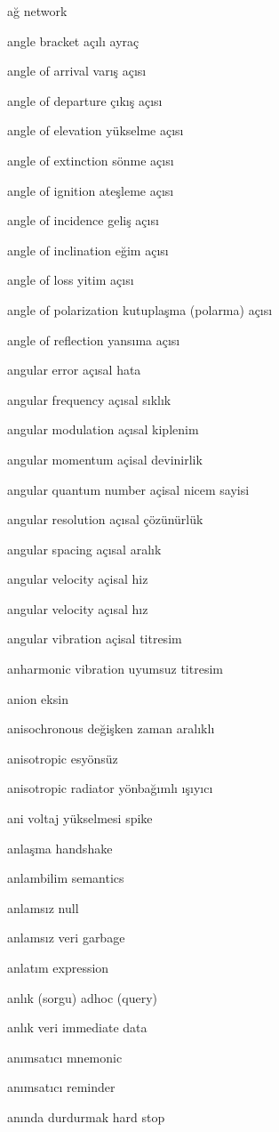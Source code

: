 \documentclass[12pt,fleqn]{article}\usepackage{../../common}
\begin{document}
ağ network

angle bracket açılı ayraç

angle of arrival varış açısı

angle of departure çıkış açısı

angle of elevation yükselme açısı

angle of extinction sönme açısı

angle of ignition ateşleme açısı

angle of incidence geliş açısı

angle of inclination eğim açısı

angle of loss yitim açısı

angle of polarization kutuplaşma (polarma) açısı

angle of reflection yansıma açısı

angular error açısal hata

angular frequency açısal sıklık

angular modulation açısal kiplenim

angular momentum açisal devinirlik

angular quantum number açisal nicem sayisi

angular resolution açısal çözünürlük

angular spacing açısal aralık

angular velocity açisal hiz

angular velocity açısal hız

angular vibration açisal titresim

anharmonic vibration uyumsuz titresim

anion eksin

anisochronous değişken zaman aralıklı

anisotropic esyönsüz

anisotropic radiator yönbağımlı ışıyıcı

ani voltaj yükselmesi spike

anlaşma handshake

anlambilim semantics

anlamsız null

anlamsız veri garbage

anlatım expression

anlık (sorgu) adhoc (query)

anlık veri immediate data

anımsatıcı mnemonic

anımsatıcı reminder

anında durdurmak hard stop
\end{document}
